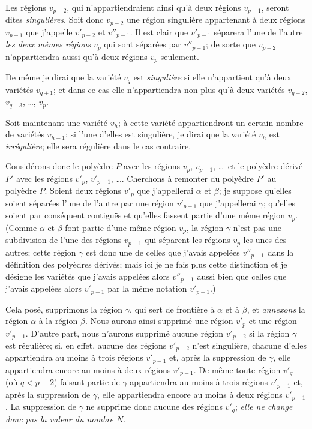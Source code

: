 \documentclass{article}
\begin{document}
Les régions $v_{p-2}$, qui n'appartiendraient ainsi qu'à deux régions $v_{p-1}$, seront dites \emph{singulières}. Soit donc $v_{p-2}$ une région singulière appartenant à deux régions $v_{p-1}$ que j'appelle $v'_{p-2}$ et $v''_{p-1}$. Il est clair que $v'_{p-1}$ séparera l'une de l'autre \emph{les deux mêmes régions} $v_{p}$ qui sont séparées par $v''_{p-1}$; de sorte que $v_{p-2}$ n'appartiendra aussi qu'à deux régions $v_{p}$ seulement.

De même je dirai que la variété $v_{q}$ est \emph{singulière} si elle n'appartient qu'à deux variétés $v_{q+1}$; et dans ce cas elle n'appartiendra non plus qu'à deux variétés $v_{q+2}$, $v_{q+3}$, \ldots, $v_{p}$.

Soit maintenant une variété $v_{h}$; à cette variété appartiendront un certain nombre de variétés $v_{h-1}$; si l'une d'elles est singulière, je dirai que la variété $v_{h}$ est \emph{irrégulière}; elle sera régulière dans le cas contraire.

Considérons donc le polyèdre $P$ avec les régions $v_{p}$, $v_{p-1}$, \ldots\ et le polyèdre dérivé $P'$ avec les régions $v'_{p}$, $v'_{p-1}$, \ldots. Cherchons à remonter du polyèdre $P'$ au polyèdre $P$. Soient deux régions $v'_{p}$ que j'appellerai $\alpha$ et $\beta$; je suppose qu'elles soient séparées l'une de l'autre par une région $v'_{p-1}$ que j'appellerai $\gamma$; qu'elles soient par conséquent contiguës et qu'elles fassent partie d'une même région $v_{p}$. (Comme $\alpha$ et $\beta$ font partie d'une même région $v_{p}$, la région $\gamma$ n'est pas une subdivision de l'une des régions $v_{p-1}$ qui séparent les régions $v_{p}$ les unes des autres; cette région $\gamma$ est donc une de celles que j'avais appelées $v''_{p-1}$ dans la définition des polyèdres dérivés; mais ici je ne fais plus cette distinction et je désigne les variétés que j'avais appelées alors $v''_{p-1}$ aussi bien que celles que j'avais appelées alors $v'_{p-1}$ par la même notation $v'_{p-1}$.)

Cela posé, supprimons la région $\gamma$, qui sert de frontière à $\alpha$ et à $\beta$, et \emph{annexons} la région $\alpha$ à la région $\beta$. Nous aurons ainsi supprimé une région $v'_{p}$ et une région $v'_{p-1}$. D'autre part, nous n'aurons supprimé aucune région $v'_{p-2}$ si la région $\gamma$ est régulière; si, en effet, aucune des régions $v'_{p-2}$ n'est singulière, chacune d'elles appartiendra au moins à trois régions $v'_{p-1}$ et, après la suppression de $\gamma$, elle appartiendra encore au moins à deux régions $v'_{p-1}$. De même toute région $v'_{q}$ (où $q < p - 2$) faisant partie de $\gamma$ appartiendra au moins à trois régions $v'_{p-1}$ et, après la suppression de $\gamma$, elle appartiendra encore au moins à deux régions $v'_{p-1}$. La suppression de $\gamma$ ne supprime donc aucune des régions $v'_{q}$; \emph{elle ne change donc pas la valeur du nombre $N$}.
\end{document}
